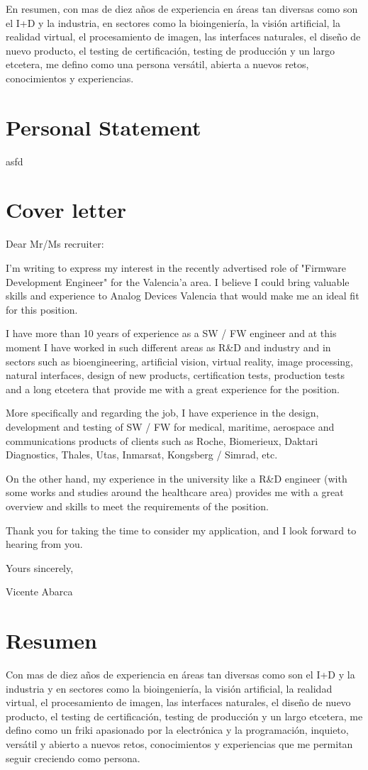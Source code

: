 \documentclass[letterpaper]{article}
\begin{document}
En resumen, con mas de diez años de experiencia en áreas tan diversas como son el I+D y la industria, en sectores como la bioingeniería, la visión artificial, la realidad virtual, el procesamiento de imagen, las interfaces naturales, el diseño de nuevo producto, el testing de certificación, testing de producción y un largo etcetera, me defino como una persona versátil, abierta a nuevos retos, conocimientos y experiencias.

\section*{Personal Statement}
asfd


\section*{Cover letter}


Dear Mr/Ms recruiter:

I'm writing to express my interest in the recently advertised role of "Firmware Development Engineer" for the Valencia'a area. I believe I could bring valuable skills and experience to Analog Devices Valencia that would make me an ideal fit for this position.

I have more than 10 years of experience as a SW / FW engineer and at this moment I have worked in such different areas as R\&D and industry and in sectors such as bioengineering, artificial vision, virtual reality, image processing, natural interfaces, design of new products, certification tests, production tests and a long etcetera that provide me with a great experience for the position.

More specifically and regarding the job, I have experience in the design, development and testing of SW / FW for medical, maritime, aerospace and communications products of clients such as Roche, Biomerieux, Daktari Diagnostics, Thales, Utas, Inmarsat, Kongsberg / Simrad, etc.

On the other hand, my experience in the university like a R\&D engineer (with some works and studies around the healthcare area) provides me with a great overview and skills to meet the requirements of the position.

Thank you for taking the time to consider my application, and I look forward to hearing from you.

Yours sincerely,

Vicente Abarca


\section*{Resumen}
Con mas de diez años de experiencia en áreas tan diversas como son el I+D y la industria y en sectores como la bioingeniería, la visión artificial, la realidad virtual, el procesamiento de imagen, las interfaces naturales, el diseño de nuevo producto, el testing de certificación, testing de producción y un largo etcetera, me defino como un friki apasionado por la electrónica y la programación, inquieto, versátil y abierto a nuevos retos, conocimientos y experiencias que me permitan seguir creciendo como persona.
\end{document}
